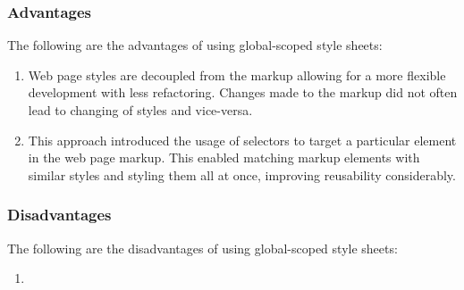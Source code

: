 \documentclass[12pt]{article}
\begin{document}
\subsubsection{Advantages}
The following are the advantages of using global-scoped style sheets:
\begin{enumerate}
	\item Web page styles are decoupled from the markup allowing for a more flexible development with less refactoring. Changes made to the markup did not often lead to changing of styles and vice-versa.

	\item This approach introduced the usage of selectors to target a particular element in the web page markup. This enabled matching markup elements with similar styles and styling them all at once, improving reusability considerably.
\end{enumerate} 

\subsubsection{Disadvantages}
The following are the disadvantages of using global-scoped style sheets:
\begin{enumerate}
	\item
\end{enumerate}




\newpage
\end{document}
